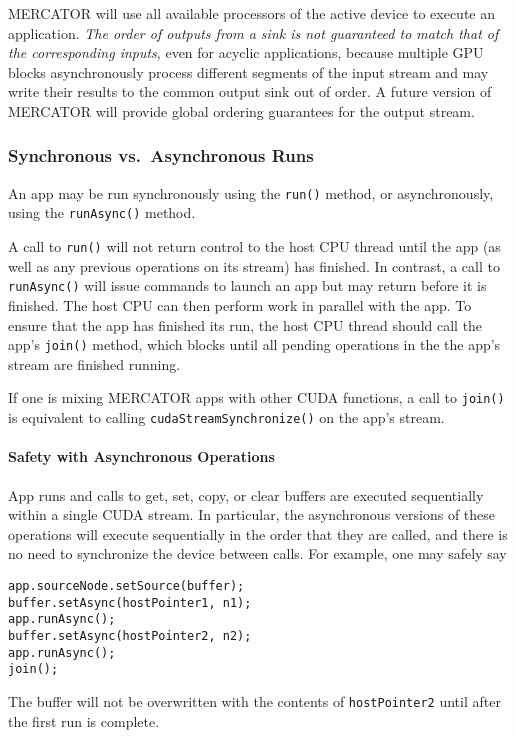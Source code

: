 \documentclass[11pt]{article}
\begin{document}
MERCATOR will use all available processors of the active device to
execute an application.  \emph{The order of outputs from a sink is not
  guaranteed to match that of the corresponding inputs}, even for
acyclic applications, because multiple GPU blocks asynchronously
process different segments of the input stream and may write their
results to the common output sink out of order.  A future version of
MERCATOR will provide global ordering guarantees for the output
stream.

\subsubsection{Synchronous vs.\ Asynchronous Runs}

An app may be run synchronously using the \texttt{run()} method,
or asynchronously, using the \texttt{runAsync()} method.

A call to \texttt{run()} will not return control to the host CPU
thread until the app (as well as any previous operations on its
stream) has finished.  In contrast, a call to \texttt{runAsync()} will
issue commands to launch an app but may return before it is finished.
The host CPU can then perform work in parallel with the app.  To
ensure that the app has finished its run, the host CPU thread should
call the app's \texttt{join()} method, which blocks until all pending
operations in the the app's stream are finished running.

If one is mixing MERCATOR apps with other CUDA functions, a call to
\texttt{join()} is equivalent to calling
\texttt{cudaStreamSynchronize()} on the app's stream.

\paragraph*{Safety with Asynchronous Operations}

App runs and calls to get, set, copy, or clear buffers are executed
sequentially within a single CUDA stream.  In particular, the
asynchronous versions of these operations will execute sequentially in
the order that they are called, and there is no need to synchronize
the device between calls.  For example, one may safely say
\begin{verbatim}
app.sourceNode.setSource(buffer);
buffer.setAsync(hostPointer1, n1);
app.runAsync();
buffer.setAsync(hostPointer2, n2);
app.runAsync();
join();
\end{verbatim}
The buffer will not be overwritten with the contents of
\texttt{hostPointer2} until after the first run is complete.
\end{document}
